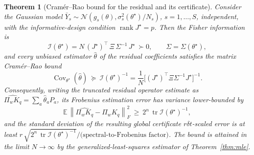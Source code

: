 \documentclass[aps,prresearch,reprint,superscriptaddress,nofootinbib,amsmath,amssymb]{revtex4-2}
\newcommand{\norm}[1]{\left\lVert #1 \right\rVert}
\newcommand{\dt}{\delta t}
\newtheorem{theorem}{Theorem}
\begin{document}
\begin{theorem}[Cram\'er--Rao bound for the residual and its certificate]
\label{thm:crb}
Consider the Gaussian model $\bar Y_s\sim\mathcal{N}(g_s(\theta),\sigma_s^2(\theta^\star)/N_s)$, $s=1,\dots,S$, independent, with the informative-design condition $\operatorname{rank}J^\star=p$. Then the Fisher information is
\begin{equation}
    \mathcal{I}(\theta^\star)=N\,(J^\star)^\top\,\Xi\,\Sigma^{-1}\,J^\star\ \succ0,
    \qquad \Sigma=\Sigma(\theta^\star),
    \label{eq:crb-fisher}
\end{equation}
and every unbiased estimator $\hat\theta$ of the residual coefficients satisfies the matrix Cram\'er--Rao bound
\begin{equation}
    \operatorname{Cov}_{\theta^\star}(\hat\theta)\ \succeq\ \mathcal{I}(\theta^\star)^{-1}
    =\frac1N\bigl[(J^\star)^\top\Xi\Sigma^{-1}J^\star\bigr]^{-1}.
    \label{eq:crb-matrix}
\end{equation}
Consequently, writing the truncated residual operator estimate as $\widehat{\Pi_wK_q}=\sum_a\hat\theta_aP_a$, its Frobenius estimation error has variance lower-bounded by
\begin{equation}
    \mathbb{E}\,\norm{\widehat{\Pi_wK_q}-\Pi_wK_q}_F^2\ \geq\ 2^n\,\operatorname{tr}\mathcal{I}(\theta^\star)^{-1},
    \label{eq:crb-frob}
\end{equation}
and the standard deviation of the resulting global certificate $r\dt$-scaled error is at least $r\,\sqrt{2^n\,\operatorname{tr}\mathcal{I}(\theta^\star)^{-1}}\big/\text{(spectral-to-Frobenius factor)}$. The bound is attained in the limit $N\to\infty$ by the generalized-least-squares estimator of Theorem~\ref{thm:mle}.
\end{theorem}
\end{document}
